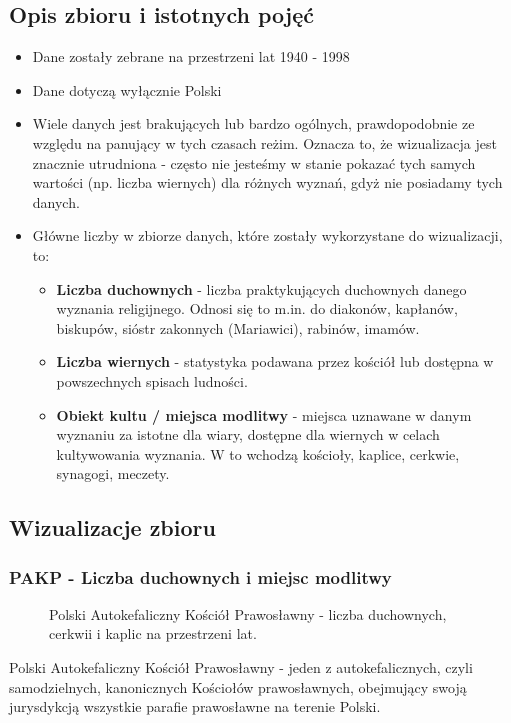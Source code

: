 \documentclass[12pt]{article}
\begin{document}
\subsection{Opis zbioru i istotnych pojęć}
\begin{itemize}
    \item Dane zostały zebrane na przestrzeni lat 1940 - 1998
    \item Dane dotyczą wyłącznie Polski
    \item Wiele danych jest brakujących lub bardzo ogólnych, prawdopodobnie ze względu na panujący w tych czasach reżim.
            Oznacza to, że wizualizacja jest znacznie utrudniona - często nie jesteśmy w stanie pokazać tych samych wartości (np. liczba wiernych) dla różnych wyznań, gdyż nie posiadamy tych danych.
    
    \item Główne liczby w zbiorze danych, które zostały wykorzystane do wizualizacji, to:
    \begin{itemize}
        \item \textbf{Liczba duchownych} - liczba praktykujących duchownych danego wyznania religijnego. Odnosi się to m.in. do diakonów, kapłanów, biskupów, sióstr zakonnych (Mariawici), rabinów, imamów.
        \item \textbf{Liczba wiernych} - statystyka podawana przez kościół lub dostępna w powszechnych spisach ludności.
        \item \textbf{Obiekt kultu / miejsca modlitwy} - miejsca uznawane w danym wyznaniu za istotne dla wiary, dostępne dla wiernych w celach kultywowania wyznania. W to wchodzą kościoły, kaplice, cerkwie,
                synagogi, meczety. 
    \end{itemize} 
\end{itemize}

\subsection{Wizualizacje zbioru}
\subsubsection{PAKP - Liczba duchownych i miejsc modlitwy}
\begin{figure}[H]
    
    \caption{Polski Autokefaliczny Kościół Prawosławny - liczba duchownych, cerkwii i kaplic na przestrzeni lat.}
\end{figure}
Polski Autokefaliczny Kościół Prawosławny -  jeden z autokefalicznych, czyli samodzielnych, kanonicznych Kościołów prawosławnych, obejmujący swoją jurysdykcją wszystkie parafie prawosławne na terenie Polski.
\end{document}
